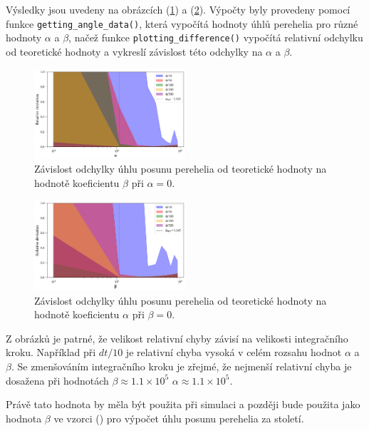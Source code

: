 \documentclass[a4paper,11pt,twocolumn]{article}
\begin{document}
            Výsledky jsou uvedeny na obrázcích (\ref{fig:phi_alpha_diff}) a (\ref{fig:phi_beta_diff}). Výpočty byly provedeny pomocí funkce \texttt{getting\_angle\_data()}, která vypočítá hodnoty úhlů perehelia pro různé hodnoty $\alpha$ a $\beta$, načež funkce \texttt{plotting\_difference()} vypočítá relativní odchylku od teoretické hodnoty a vykreslí závislost této odchylky na $\alpha$ a $\beta$. 

            \begin{figure}
                \centering
                \includegraphics[width=0.5\textwidth]{phi_alpha_diff.png}
                \caption{Závislost odchylky úhlu posunu perehelia od teoretické hodnoty na hodnotě koeficientu $\beta$ při $\alpha = 0$.}
                \label{fig:phi_alpha_diff}
            \end{figure}

            \begin{figure}
                \centering
                \includegraphics[width=0.5\textwidth]{phi_beta_diff.png}
                \caption{Závislost odchylky úhlu posunu perehelia od teoretické hodnoty na hodnotě koeficientu $\alpha$ při $\beta = 0$.}
                \label{fig:phi_beta_diff}
            \end{figure}

            Z obrázků je patrné, že velikost relativní chyby závisí na velikosti integračního kroku. Například při $dt/10$ je relativní chyba vysoká v celém rozsahu hodnot $\alpha$ a $\beta$. Se zmenšováním integračního kroku je zřejmé, že nejmenší relativní chyba je dosažena při hodnotách $\beta \approx 1.1 \times 10^5$  $\alpha \approx 1.1 \times 10^5$. 

            Právě tato hodnota by měla být použita při simulaci a později bude použita jako hodnota $\beta$ ve vzorci () pro výpočet úhlu posunu perehelia za století.
\end{document}
